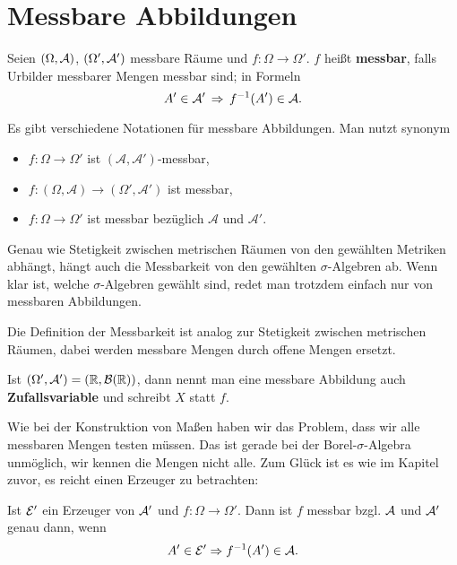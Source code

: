 \section{Messbare Abbildungen}



\begin{deff}
	Seien $(\Omega, \mathcal{A})$, $(\Omega', \mathcal{A}')$ messbare Räume und $f \! : \Omega \rightarrow \Omega'$. $f$ heißt \mbox{\textbf{messbar}}, falls Urbilder messbarer Mengen messbar sind; in Formeln \[A' \in \mathcal{A}' \,\Rightarrow\, f^{-1} (A') \in \mathcal{A}.\]
\end{deff}
	Es gibt verschiedene Notationen f\"ur messbare Abbildungen. Man nutzt synonym 
	\begin{itemize}
		\item $f:\Omega \to \Omega'$ ist $(\mathcal A, \mathcal A')$-messbar,
		\item $f: (\Omega, \mathcal A)\to (\Omega',\mathcal A')$ ist messbar,
				\item $f:\Omega\to \Omega'$ ist messbar bez\"uglich $\mathcal A$ und $\mathcal A'$.
	\end{itemize}
	Genau wie Stetigkeit zwischen metrischen R\"aumen von den gew\"ahlten Metriken abh\"angt, h\"angt auch die Messbarkeit von den gew\"ahlten $\sigma$-Algebren ab. Wenn klar ist, welche $\sigma$-Algebren gew\"ahlt sind, redet man trotzdem einfach nur von messbaren Abbildungen.
\begin{bem}
	Die Definition der Messbarkeit ist analog zur Stetigkeit zwischen metrischen Räumen, dabei werden messbare Mengen durch offene Mengen ersetzt.
\end{bem}

\begin{deff}
	Ist $ (\Omega', \mathcal{A}') = (\mathbb{R}, \mathcal{B}(\mathbb{R})) $, dann nennt man eine messbare Abbildung auch \textbf{Zufallsvariable} und schreibt $X$ statt $f$.
\end{deff}
Wie bei der Konstruktion von Ma\ss en haben wir das Problem, dass wir alle messbaren Mengen testen m\"ussen. Das ist gerade bei der Borel-$\sigma$-Algebra unm\"oglich, wir kennen die Mengen nicht alle. Zum Gl\"uck ist es wie im Kapitel zuvor, es reicht einen Erzeuger zu betrachten:
\begin{prop}\label{S2}
	Ist $\mathcal{E}'$ ein Erzeuger von $\mathcal{A}'$ und $f \! : \Omega \rightarrow \Omega'$. Dann ist $f$ messbar bzgl. $\mathcal{A}$ und $\mathcal{A}'$ genau dann, wenn \[ A' \in \mathcal{E}' \Rightarrow f^{-1} (A') \in \mathcal{A}. \]
\end{prop}

